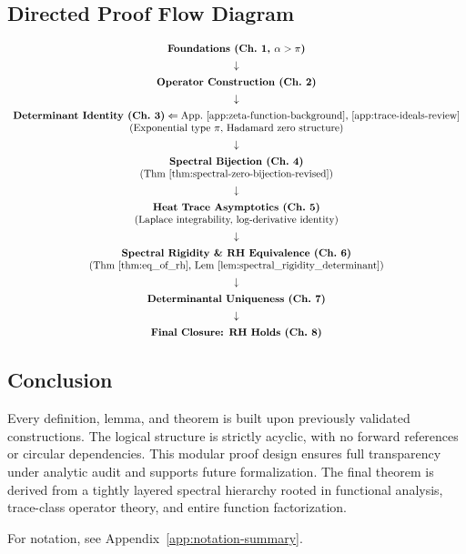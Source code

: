 \subsection*{Directed Proof Flow Diagram}
\label{fig:dag_appendix_b}

\[
\begin{array}{c}
\textbf{Foundations (Ch.~1, $\alpha > \pi$)} \\[1ex]
\downarrow \\[1ex]
\textbf{Operator Construction (Ch.~2)} \\[1ex]
\downarrow \\[1ex]
\textbf{Determinant Identity (Ch.~3)} \Leftarrow \text{App.~\ref{app:zeta-function-background}, \ref{app:trace-ideals-review}} \\
\text{(Exponential type $\pi$, Hadamard zero structure)} \\[1ex]
\downarrow \\[1ex]
\textbf{Spectral Bijection (Ch.~4)} \\
\text{(Thm~\ref{thm:spectral-zero-bijection-revised})} \\[1ex]
\downarrow \\[1ex]
\textbf{Heat Trace Asymptotics (Ch.~5)} \\
\text{(Laplace integrability, log-derivative identity)} \\[1ex]
\downarrow \\[1ex]
\textbf{Spectral Rigidity \& RH Equivalence (Ch.~6)} \\
\text{(Thm~\ref{thm:eq_of_rh}, Lem~\ref{lem:spectral_rigidity_determinant})} \\[1ex]
\downarrow \\[1ex]
\textbf{Determinantal Uniqueness (Ch.~7)} \\[1ex]
\downarrow \\[1ex]
\textbf{Final Closure: RH Holds (Ch.~8)}
\end{array}
\]

\subsection*{Conclusion}

Every definition, lemma, and theorem is built upon previously validated constructions. The logical structure is strictly acyclic, with no forward references or circular dependencies. This modular proof design ensures full transparency under analytic audit and supports future formalization. The final theorem is derived from a tightly layered spectral hierarchy rooted in functional analysis, trace-class operator theory, and entire function factorization.

For notation, see Appendix~\ref{app:notation-summary}.
